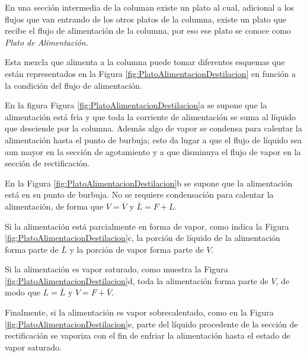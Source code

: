 \documentclass[11pt]{book}
\begin{document}
En una sección intermedia de la columan existe un plato al cual, adicional a los flujos que van entrando de los otros platos de la columna, existe un plato que recibe el flujo de alimentación de la columna, por eso ese plato se conoce como \textit{Plato de Alimentación}. 

Esta mezcla que alimenta a la columna puede tomar diferentes esquemas que están representados en la Figura \ref{fig:PlatoAlimentacionDestilacion} en función a la condición del flujo de alimentación. 

En la figura Figura \ref{fig:PlatoAlimentacionDestilacion}a se supone que la alimentación está fría y que toda la corriente de alimentación se suma al líquido que desciende por la columna. Además algo de vapor se condensa para calentar la alimentación hasta el punto de burbuja; esto da lugar a que el flujo de líquido sea aun mayor en la sección de agotamiento y a que disminuya el flujo de vapor en la sección de rectificación.

En la Figura \ref{fig:PlatoAlimentacionDestilacion}b se supone que la alimentación está en su punto de burbuja. No se requiere condensación para calentar la alimentación, de forma que $V = \overline{V}$ y $\overline{L} = F+L$.

Si la alimentación está parcialmente en forma de vapor, como indica la Figura \ref{fig:PlatoAlimentacionDestilacion}c, la porción de líquido de la alimentación forma parte de $\overline{L}$ y la porción de vapor forma parte de $V$.

Si la alimentación es vapor saturado, como muestra la Figura \ref{fig:PlatoAlimentacionDestilacion}d, toda la alimentación forma parte de $V$, de modo que $L = \overline{L}$ y $V = F + \overline{V}$.

Finalmente, si la alimentación es vapor sobrecalentado, como en la Figura \ref{fig:PlatoAlimentacionDestilacion}e, parte del líquido procedente de la sección de rectificación se vaporiza con el fin de enfriar la alimentación hasta el estado de vapor saturado. 
\end{document}
